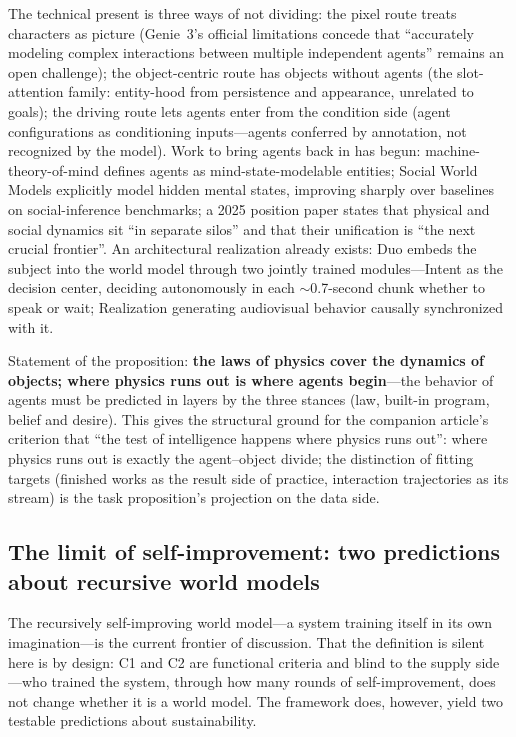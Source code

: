 \documentclass[10pt]{article}
\begin{document}
The technical present is three ways of not dividing: the pixel route treats characters as picture (Genie~3's official limitations concede that ``accurately modeling complex interactions between multiple independent agents'' remains an open challenge\cite{deepmind2025genie3}); the object-centric route has objects without agents (the slot-attention family: entity-hood from persistence and appearance, unrelated to goals\cite{locatello2020slot}); the driving route lets agents enter from the condition side (agent configurations as conditioning inputs\cite{wayve2025gaia2}---agents conferred by annotation, not recognized by the model). Work to bring agents back in has begun: machine-theory-of-mind defines agents as mind-state-modelable entities\cite{rabinowitz2018tom}; Social World Models explicitly model hidden mental states, improving sharply over baselines on social-inference benchmarks\cite{liu2025swm}; a 2025 position paper states that physical and social dynamics sit ``in separate silos'' and that their unification is ``the next crucial frontier''\cite{zhang2025unification}. An architectural realization already exists: Duo embeds the subject into the world model through two jointly trained modules---Intent as the decision center, deciding autonomously in each $\sim$0.7-second chunk whether to speak or wait; Realization generating audiovisual behavior causally synchronized with it\cite{duo2026}.

Statement of the proposition: \textbf{the laws of physics cover the dynamics of objects; where physics runs out is where agents begin}---the behavior of agents must be predicted in layers by the three stances (law, built-in program, belief and desire). This gives the structural ground for the companion article's criterion that ``the test of intelligence happens where physics runs out''\cite{yu2026worldmodelq}: where physics runs out is exactly the agent--object divide; the distinction of fitting targets (finished works as the result side of practice, interaction trajectories as its stream) is the task proposition's projection on the data side.

\subsection{The limit of self-improvement: two predictions about recursive world models}\label{sec:selfimprove}

The recursively self-improving world model---a system training itself in its own imagination---is the current frontier of discussion. That the definition is silent here is by design: C1 and C2 are functional criteria and blind to the supply side---who trained the system, through how many rounds of self-improvement, does not change whether it is a world model. The framework does, however, yield two testable predictions about sustainability.
\end{document}
